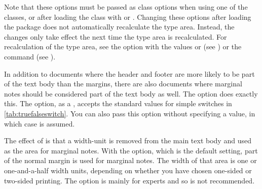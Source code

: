 Note that these options must be passed as class options
when using one of the {\KOMAScript} classes, or after loading the class with
 or .
Changing these options after loading the  package does not
automatically recalculate the type area. Instead, the changes only take effect
the next time the type area is recalculated. For recalculation of the type
area, see the \hyperref[desc:\LabelBase.option.DIV.last]{} option
with the values \hyperref[desc:\LabelBase.option.DIV.last]{} or
\hyperref[desc:\LabelBase.option.DIV.current]{} (see
) or the
 command (see
).%
%
\EndIndexGroup


\begin{Declaration}
\end{Declaration}
In addition to documents where the header and footer are more likely to
be part of the text body than the margins, there are also documents where
marginal notes should be considered part of the text body as well. The option
 does exactly this. The option, as a , accepts the standard values
for simple switches in \autoref{tab:truefalseswitch}. You can also pass this
option without specifying a value, in which case  is assumed.

The effect of %
 is that a width-unit is removed from
the main text body and used as the area for marginal notes. With the
 option, which is the default setting, part of
the normal margin is used for marginal notes. The width of that area is one or
one-and-a-half width units, depending on whether you have chosen one-sided or
two-sided printing. The  option is mainly for
experts and so is not recommended.
  
